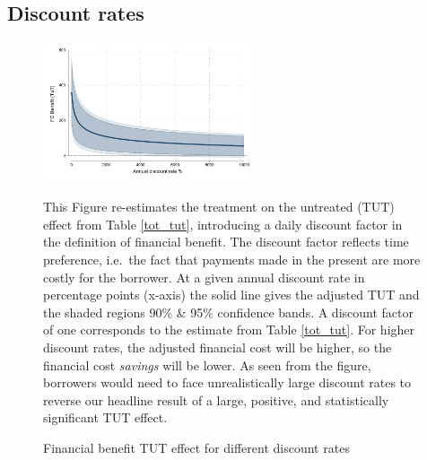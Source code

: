 \vspace{.3in}

\subsection{Discount rates}


\begin{figure}[H]
        \caption{Financial benefit TUT effect for different discount rates}
    \label{fc_discount_rates}
    \begin{center}
        \centering
        \includegraphics[width=0.55\textwidth]{Figuras/discount_effect_tut.pdf}
    \end{center}
     \scriptsize This Figure re-estimates the treatment on the untreated (TUT) effect from Table \ref{tot_tut}, introducing a daily discount factor in the definition of financial benefit. The discount factor reflects time preference, i.e.\ the fact that payments made in the present are more costly for the borrower. At a given annual discount rate in percentage points (x-axis) the solid line gives the adjusted TUT and the shaded regions 90\% \& 95\% confidence bands. A discount factor of one corresponds to the estimate from Table \ref{tot_tut}. For higher discount rates, the adjusted financial cost will be higher, so the financial cost \emph{savings} will be lower. As seen from the figure, borrowers would need to face unrealistically large discount rates to reverse our headline result of a large, positive, and statistically significant TUT effect.
\end{figure}


